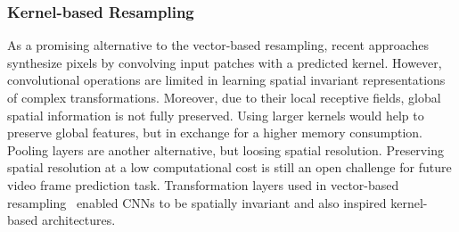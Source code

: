 \subsubsection{Kernel-based Resampling}
As a promising alternative to the vector-based resampling, recent approaches synthesize pixels by convolving input patches with a predicted kernel. However, convolutional operations are limited in learning spatial invariant representations of complex transformations. Moreover, due to their local receptive fields, global spatial information is not fully preserved. Using larger kernels would help to preserve global features, but in exchange for a higher memory consumption. Pooling layers are another alternative, but loosing spatial resolution. Preserving spatial resolution at a low computational cost is still an open challenge for future video frame prediction task. Transformation layers used in vector-based resampling~\cite{Jaderberg2015,Patraucean2015,Liu2017} enabled \acp{CNN} to be spatially invariant and also inspired kernel-based architectures.

